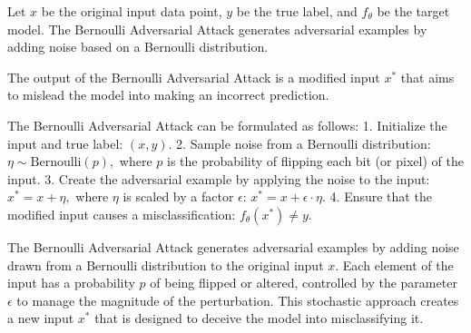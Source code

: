 Let \( x \) be the original input data point, \( y \) be the true label, and \( f_{\theta} \) be the target model. The Bernoulli Adversarial Attack generates adversarial examples by adding noise based on a Bernoulli distribution.

The output of the Bernoulli Adversarial Attack is a modified input \( x^* \) that aims to mislead the model into making an incorrect prediction.

The Bernoulli Adversarial Attack can be formulated as follows:
1. Initialize the input and true label:
   $
   (x, y).
   $
2. Sample noise from a Bernoulli distribution:
   $
   \eta \sim \text{Bernoulli}(p),
   $
   where \( p \) is the probability of flipping each bit (or pixel) of the input.
3. Create the adversarial example by applying the noise to the input:
   $
   x^* = x + \eta,
   $
   where \( \eta \) is scaled by a factor \( \epsilon \):
   $
   x^* = x + \epsilon \cdot \eta.
   $
4. Ensure that the modified input causes a misclassification:
   $
   f_{\theta}(x^*) \neq y.
   $

The Bernoulli Adversarial Attack generates adversarial examples by adding noise drawn from a Bernoulli distribution to the original input \( x \). Each element of the input has a probability \( p \) of being flipped or altered, controlled by the parameter \( \epsilon \) to manage the magnitude of the perturbation. This stochastic approach creates a new input \( x^* \) that is designed to deceive the model into misclassifying it.
